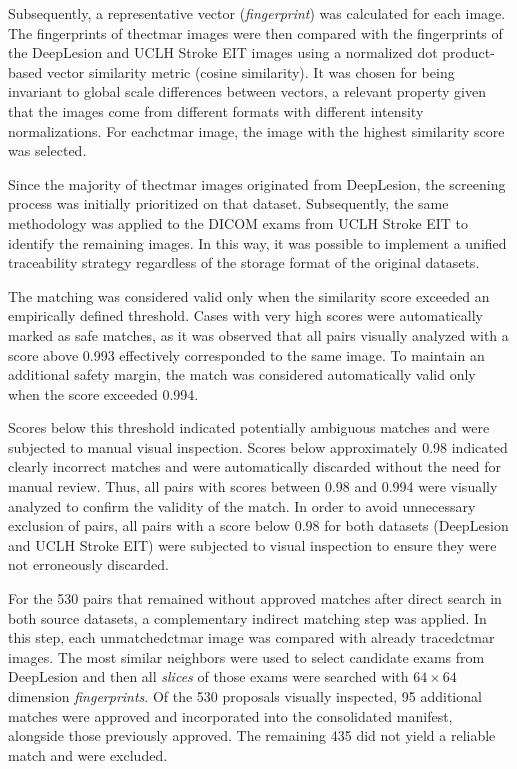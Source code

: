 Subsequently, a representative vector (\textit{fingerprint}) was calculated for each image. The fingerprints of the\acrshort{ctmar} images were then compared with the fingerprints of the DeepLesion and UCLH Stroke EIT images using a normalized dot product-based vector similarity metric (cosine similarity). It was chosen for being invariant to global scale differences between vectors, a relevant property given that the images come from different formats with different intensity normalizations. For each\acrshort{ctmar} image, the image with the highest similarity score was selected.

Since the majority of the\acrshort{ctmar} images originated from DeepLesion, the screening process was initially prioritized on that dataset. Subsequently, the same methodology was applied to the DICOM exams from UCLH Stroke EIT to identify the remaining images. In this way, it was possible to implement a unified traceability strategy regardless of the storage format of the original datasets.

The matching was considered valid only when the similarity score exceeded an empirically defined threshold. Cases with very high scores were automatically marked as safe matches, as it was observed that all pairs visually analyzed with a score above 0.993 effectively corresponded to the same image. To maintain an additional safety margin, the match was considered automatically valid only when the score exceeded 0.994.

Scores below this threshold indicated potentially ambiguous matches and were subjected to manual visual inspection. Scores below approximately 0.98 indicated clearly incorrect matches and were automatically discarded without the need for manual review. Thus, all pairs with scores between 0.98 and 0.994 were visually analyzed to confirm the validity of the match. In order to avoid unnecessary exclusion of pairs, all pairs with a score below 0.98 for both datasets (DeepLesion and UCLH Stroke EIT) were subjected to visual inspection to ensure they were not erroneously discarded.

For the 530 pairs that remained without approved matches after direct search in both source datasets, a complementary indirect matching step was applied. In this step, each unmatched\acrshort{ctmar} image was compared with already traced\acrshort{ctmar} images. The most similar neighbors were used to select candidate exams from DeepLesion and then all \textit{slices} of those exams were searched with $64\times64$ dimension \textit{fingerprints}. Of the 530 proposals visually inspected, 95 additional matches were approved and incorporated into the consolidated manifest, alongside those previously approved. The remaining 435 did not yield a reliable match and were excluded.

